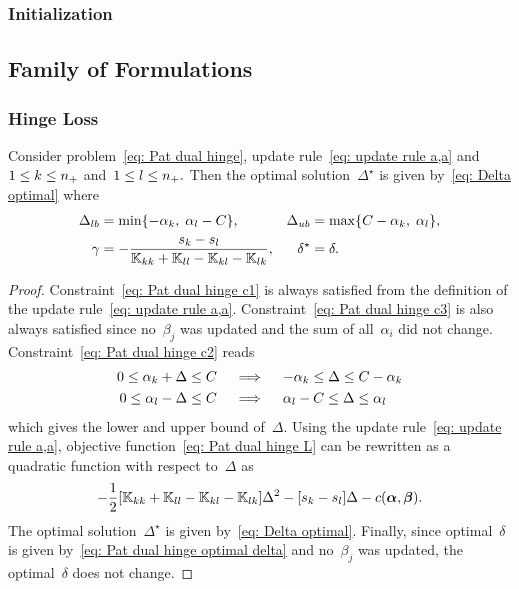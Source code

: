 \subsubsection{Initialization}

\subsection{Family of \PatMat Formulations}

\subsubsection{Hinge Loss}

\begin{lemma}
  Consider problem~\eqref{eq: Pat dual hinge}, update rule~\eqref{eq: update rule a,a} and~$1 \leq k \leq n_{+}$ and~$1 \leq l \leq n_{+}.$ Then the optimal solution~$\Delta^{\star}$ is given by~\eqref{eq: Delta optimal} where
  \begin{align*}
    \Delta_{lb} & = \min\{- \alpha_k,\; \alpha_l - C\}, &
    \Delta_{ub} & = \max\{C - \alpha_k,\; \alpha_l\}, \\
    \gamma & = -\frac{s_k - s_l}{\mathbb{K}_{kk} + \mathbb{K}_{ll} - \mathbb{K}_{kl} - \mathbb{K}_{lk}}, &
    \delta^{\star} & = \delta.
  \end{align*}
\end{lemma}

\begin{proof}
  Constraint~\eqref{eq: Pat dual hinge c1} is always satisfied from the definition of the update rule~\eqref{eq: update rule a,a}. Constraint~\eqref{eq: Pat dual hinge c3} is also always satisfied since no~$\beta_j$ was updated and the sum of all~$\alpha_i$ did not change. Constraint~\eqref{eq: Pat dual hinge c2} reads
  \begin{align*}
    0 \leq \alpha_k + \Delta \leq C
    & \quad \implies \quad
    - \alpha_k \leq \Delta \leq C - \alpha_k \\
    0 \leq \alpha_l - \Delta \leq C
    & \quad \implies \quad
    \alpha_l - C \leq \Delta \leq \alpha_l
  \end{align*}
  which gives the lower and upper bound of~$\Delta.$ Using the update rule~\eqref{eq: update rule a,a}, objective function~\eqref{eq: Pat dual hinge L} can be rewritten as a quadratic function with respect to~$\Delta$ as
  \begin{equation*}
    - \frac{1}{2} \Brac[s]{\K_{kk} + \K_{ll} - \K_{kl} - \K_{lk}} \Delta^2
    - \Brac[s]{s_k - s_l} \Delta
    - c(\bm{\alpha}, \bm{\beta}).
  \end{equation*}
  The optimal solution~$\Delta^{\star}$ is given by~\eqref{eq: Delta optimal}. Finally, since optimal~$\delta$ is given by~\eqref{eq: Pat dual hinge optimal delta} and no~$\beta_j$ was updated, the optimal~$\delta$ does not change.
\end{proof}

